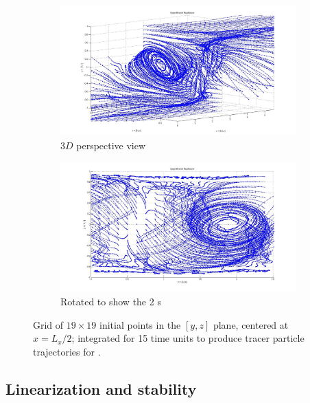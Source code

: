 \documentclass[lineno]{jfm}
\begin{document}
\begin{figure}
\centering
    \begin{subfigure}{0.98\textwidth}
    \includegraphics[width=1.0\textwidth]{fig_UB1.jpg}
      \caption{
        $3D$ perspective view
       }
      \label{fig:UBs_a}
    \end{subfigure}

    \begin{subfigure}{0.98\textwidth}
    \includegraphics[width=1.0\textwidth]{fig_UB1eq.jpg}
      \caption{
        Rotated to show the 2 \stagp s
       }
      \label{fig:UBs_b}
    \end{subfigure}
    \caption{
Grid of $19 \times 19$  initial points in the $[y,z]$ plane, centered at 
$x = L_x/2$; integrated for 15 time units to produce tracer particle 
trajectories for {\tEQtwo}.} 
\label{fig:UBs}
 \end{figure}


\subsection{Linearization and stability}
\end{document}
